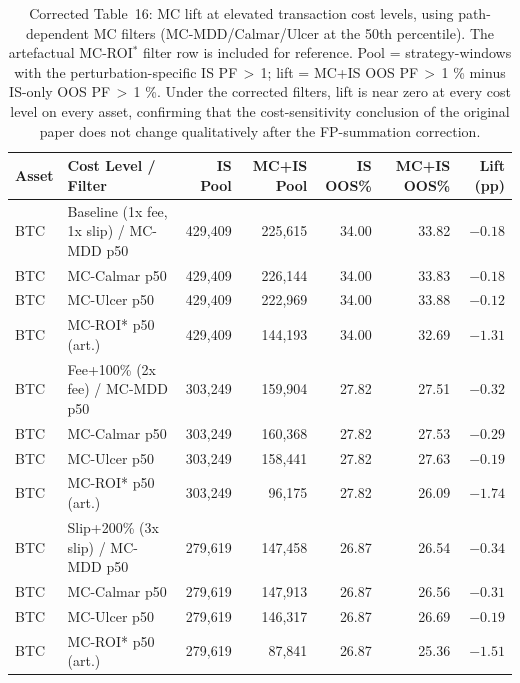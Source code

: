 \begin{table}[ht]
\centering
\caption{Corrected Table~16: MC lift at elevated transaction cost levels, using path-dependent MC filters (MC-MDD/Calmar/Ulcer at the 50th percentile). The artefactual MC-ROI$^*$ filter row is included for reference. Pool = strategy-windows with the perturbation-specific IS PF\,$>$\,1; lift = MC+IS OOS PF\,$>$\,1 \% minus IS-only OOS PF\,$>$\,1 \%. Under the corrected filters, lift is near zero at every cost level on every asset, confirming that the cost-sensitivity conclusion of the original paper does not change qualitatively after the FP-summation correction.}
\label{tab:cost_sensitivity_corrected}
\small
\begin{tabular}{llrrrrr}
\toprule
Asset & Cost Level / Filter & IS Pool & MC+IS Pool & IS OOS\% & MC+IS OOS\% & Lift (pp) \\
\midrule
BTC & Baseline (1x fee, 1x slip) / MC-MDD p50 & 429,409 & 225,615 & 34.00 & 33.82 & $-0.18$ \\
BTC & \hspace{1em}MC-Calmar p50 & 429,409 & 226,144 & 34.00 & 33.83 & $-0.18$ \\
BTC & \hspace{1em}MC-Ulcer p50 & 429,409 & 222,969 & 34.00 & 33.88 & $-0.12$ \\
BTC & \hspace{1em}MC-ROI* p50 (art.) & 429,409 & 144,193 & 34.00 & 32.69 & $-1.31$ \\
BTC & Fee+100\% (2x fee) / MC-MDD p50 & 303,249 & 159,904 & 27.82 & 27.51 & $-0.32$ \\
BTC & \hspace{1em}MC-Calmar p50 & 303,249 & 160,368 & 27.82 & 27.53 & $-0.29$ \\
BTC & \hspace{1em}MC-Ulcer p50 & 303,249 & 158,441 & 27.82 & 27.63 & $-0.19$ \\
BTC & \hspace{1em}MC-ROI* p50 (art.) & 303,249 & 96,175 & 27.82 & 26.09 & $-1.74$ \\
BTC & Slip+200\% (3x slip) / MC-MDD p50 & 279,619 & 147,458 & 26.87 & 26.54 & $-0.34$ \\
BTC & \hspace{1em}MC-Calmar p50 & 279,619 & 147,913 & 26.87 & 26.56 & $-0.31$ \\
BTC & \hspace{1em}MC-Ulcer p50 & 279,619 & 146,317 & 26.87 & 26.69 & $-0.19$ \\
BTC & \hspace{1em}MC-ROI* p50 (art.) & 279,619 & 87,841 & 26.87 & 25.36 & $-1.51$ \\

\end{tabular}
\end{table}
